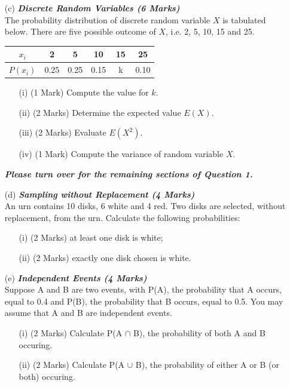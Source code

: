 \documentclass[a4paper,12pt]{article}
\begin{document}
\begin{itemize}
\item[(c)] \textbf{\textit{Discrete Random Variables (6 Marks)}}\\
 The probability distribution of discrete random variable $X$ is tabulated below. There are five possible outcome of $X$, i.e. 2, 5, 10, 15 and 25.
\begin{center}
\begin{tabular}{|c||c|c|c|c|c|}
\hline
$x_i$ & 2 &  5 & 10 & 15 & 25  \\ \hline
$P(x_i)$ & 0.25 & 0.25 & 0.15 & \mbox{ k }  & 0.10 \\ \hline
\end{tabular}
\end{center}

\begin{itemize}
\item[(i)] (1 Mark) Compute the value for $k$.
\item[(ii)] (2 Marks) Determine the expected value $E(X)$.
\item[(iii)] (2 Marks) Evaluate $E(X^2)$.
\item[(iv)] (1 Mark) Compute the variance of random variable $X$.
\end{itemize}
{
\normalsize
\textit{\textbf{Please turn over for the remaining sections of Question 1.}}
}
\newpage
\item[(d)]  \textbf{\textit{Sampling without Replacement (4 Marks)}}\\
An urn contains 10 disks, 6 white and 4 red.  Two disks are selected, without replacement, from the urn.  Calculate the following probabilities:
 
\begin{itemize}
\item[(i)] (2 Marks) at least one disk is white;
\item[(ii)] (2 Marks)  exactly one disk chosen is white.
\end{itemize}
 
\item[(e)]\textbf{\textit{Independent Events (4 Marks)}}\\ Suppose A and B are two events, with P(A), the probability that A occurs, equal to 0.4 and P(B), the probability that B occurs, equal to 0.5. You may assume that A and B are independent events.
\begin{itemize}
\item[(i)] (2 Marks) Calculate P(A $\cap$ B), the probability of both A and B occuring. %
\item[(ii)] (2 Marks) Calculate P(A $\cup$ B), the probability of either A or B (or both) occuring.
\end{itemize}
\end{itemize}
\end{document}
